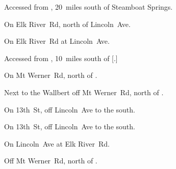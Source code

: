 
\begin{LocationList}

Accessed from , 20~miles south of Steamboat Springs.

\Location{\GarageHQ \Garage}
On Elk River~Rd, north of  Lincoln~Ave.

\Location{\GasStation \Gas}
On Elk River~Rd at  Lincoln~Ave.

Accessed from , 10~miles south of [.]

On Mt Werner~Rd, north of .

\Location{\RestArea \Rest}
Next to the Wallbert off Mt Werner~Rd, north of .

On 13th~St, off  Lincoln~Ave to the south.

\Location{\TruckService \Service}
On 13th~St, off  Lincoln~Ave to the south.

On  Lincoln~Ave at Elk River~Rd.

Off Mt Werner~Rd, north of .

\end{LocationList}
